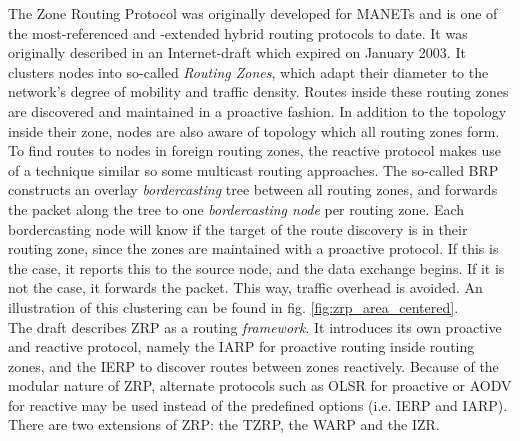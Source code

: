 \documentclass[a4paper,10pt]{scrartcl}
\begin{document}
The Zone Routing Protocol was originally developed for \glspl{MANET} and is one of the most-referenced and -extended hybrid routing protocols to date. It was originally described in an Internet-draft which expired on January 2003\cite{ZRP-Draft}.
It clusters nodes into so-called \emph{Routing Zones}, which adapt their diameter to the network's degree of mobility and traffic density. Routes inside these routing zones are discovered and maintained in a proactive fashion. In addition to the topology inside their zone, nodes are also aware of topology which all routing zones form.
To find routes to nodes in foreign routing zones, the reactive protocol makes use of a technique similar so some multicast routing approaches. The so-called \gls{BRP}\cite{draft-ietf-manet-zone-brp} constructs an overlay \emph{bordercasting} tree between all routing zones, and forwards the packet along the tree to one \emph{bordercasting node} per routing zone. Each bordercasting node will know if the target of the route discovery is in their routing zone, since the zones are maintained with a proactive protocol. If this is the case, it reports this to the source node, and the data exchange begins. If it is not the case, it forwards the packet. This way, traffic overhead is avoided. An illustration of this clustering can be found in fig. \ref{fig:zrp_area_centered}.\\
The draft describes ZRP as a routing \emph{framework}. It introduces its own proactive and reactive protocol, namely the \gls{IARP}\cite{draft-ietf-manet-zone-iarp} for proactive routing inside routing zones, and the \gls{IERP}\cite{draft-ietf-manet-zone-ierp} to discover routes between zones reactively. Because of the modular nature of ZRP, alternate protocols such as OLSR for proactive or AODV for reactive may be used instead of the predefined options (i.e. IERP and IARP).\\
There are two extensions of ZRP: the \gls{TZRP}\cite{TZRP}, the \gls{WARP}\cite{WARP} and the \gls{IZR}\cite{IZR}.
\end{document}

